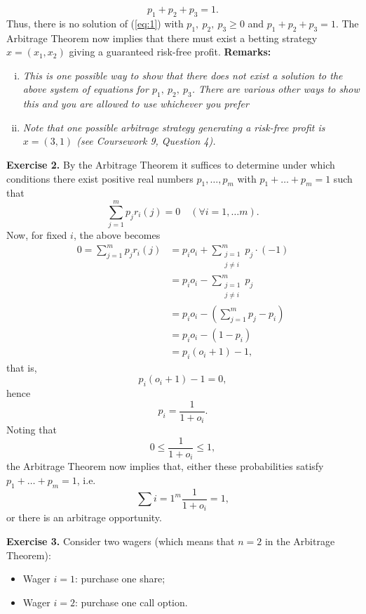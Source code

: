 \documentclass[11pt,a4paper]{article}
\begin{document}
    $$
    p_1+p_2+p_3 = 1.
    $$
    Thus, there is no solution of (\ref{eq:1}) with $p_1,\ p_2,\ p_3 \geq 0$ and $p_1 + p_2 + p_3 = 1$. The Arbitrage Theorem now implies that there must exist a betting strategy $x = (x_1, x_2)$ giving a guaranteed risk-free profit.
    \newpage
    \hspace*{1cm} \textbf{Remarks:}
    \begin{enumerate}[(i)]
        \item \textsl{This is one possible way to show that there does not exist a solution to the above system of equations for $p_1,\ p_2,\ p_3$. There are various other ways to show this and you are allowed to use whichever you prefer}
        \item \textsl{Note that one possible arbitrage strategy generating a risk-free profit is $x = (3, 1)$ (see Coursework 9, Question 4).}
    \end{enumerate}
    \textbf{Exercise 2.} By the Arbitrage Theorem it suffices to determine under which conditions there exist positive real numbers $p_1, \ldots , p_m$ with $p_1 + \ldots + p_m = 1$ such that
    $$
    \sum_{j=1}^mp_jr_i(j) = 0 \quad (\forall i = 1, \ldots m).
    $$
    Now, for fixed $i$, the above becomes
    \begin{align*}
        0 
        = \sum_{j=1}^m p_jr_i(j)
        &= p_io_i+ \sum_{\substack{j = 1\\j\neq i}}^m p_j \cdot (-1)\\
        &=p_io_i - \sum_{\substack{j= 1\\j\neq i}}^m p_j\\
        &= p_io_i - \left(\sum_{j=1}^m p_j-p_i\right)\\
        &= p_io_i-(1-p_i)\\
        &= p_i(o_i+1)-1,
    \end{align*}
    that is,
    $$
    p_i(o_i + 1) − 1 = 0 ,
    $$
    hence
    $$
    p_i = \frac{1}{1+o_i}.
    $$
    Noting that
    $$
    0 \leq \frac{1}{1+o_i} \leq 1,
    $$
    the Arbitrage Theorem now implies that, either these probabilities satisfy $p_1 + \ldots + p_m = 1$, i.e.
    $$
    \sum{i=1}^m \frac{1}{1+o_i} = 1,
    $$
    or there is an arbitrage opportunity.\par 
    \textbf{Exercise 3.} Consider two wagers (which means that $n = 2$ in the Arbitrage Theorem):
    \begin{itemize}
        \item Wager $i = 1$: purchase one share;
        \item Wager $i = 2$: purchase one call option.
    \end{itemize}
\end{document}
